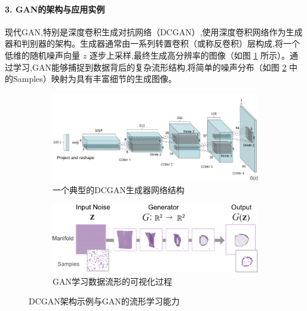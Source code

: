 \begin{itemize}
    \paragraph{3. GAN的架构与应用实例}
    现代GAN,特别是深度卷积生成对抗网络（DCGAN）,使用深度卷积网络作为生成器和判别器的架构。生成器通常由一系列转置卷积（或称反卷积）层构成,将一个低维的随机噪声向量 $z$ 逐步上采样,最终生成高分辨率的图像（如图 \ref{fig:dcgan_generator_arch} 所示）。通过学习,GAN能够捕捉到数据背后的复杂流形结构,将简单的噪声分布（如图 \ref{fig:gan_manifold_learning} 中的Samples）映射为具有丰富细节的生成图像。

    \begin{figure}[H]
        \centering
        \begin{subfigure}[b]{0.48\textwidth}
            \centering
            \includegraphics[width=\textwidth]{figures/GAN7.png}
            \caption{一个典型的DCGAN生成器网络结构}
            \label{fig:dcgan_generator_arch}
        \end{subfigure}
        \hfill
        \begin{subfigure}[b]{0.48\textwidth}
            \centering
            \includegraphics[width=\textwidth]{figures/GAN8.png}
            \caption{GAN学习数据流形的可视化过程}
            \label{fig:gan_manifold_learning}
        \end{subfigure}
        \caption{DCGAN架构示例与GAN的流形学习能力}
        \label{fig:gan_arch_and_manifold}
    \end{figure}


\end{itemize}

